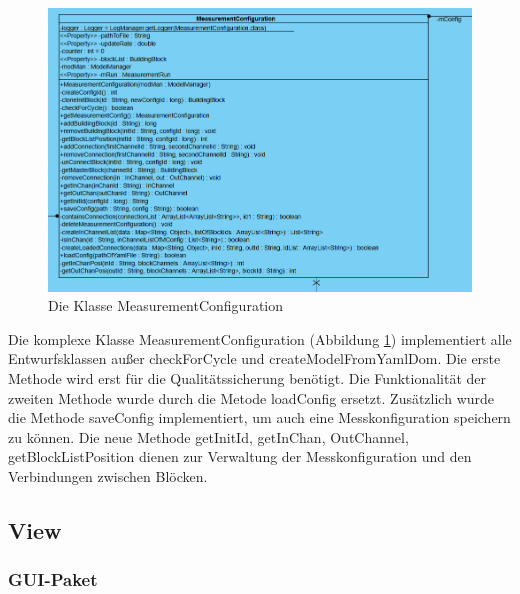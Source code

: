 \documentclass[parskip=full]{scrartcl}
\begin{document}
\begin{figure}[htbp]
	\begin{center}
		\includegraphics[width = 14cm]{Grafiken/messconfig.PNG}
		\caption{Die Klasse MeasurementConfiguration}
		\label{messconfig}
	\end{center}
\end{figure}

Die komplexe Klasse MeasurementConfiguration (Abbildung \ref{messconfig}) implementiert alle Entwurfsklassen außer checkForCycle und createModelFromYamlDom. Die erste Methode wird erst für die Qualitätssicherung benötigt. Die Funktionalität der zweiten Methode wurde durch die Metode loadConfig ersetzt. Zusätzlich wurde die Methode saveConfig implementiert, um auch eine Messkonfiguration speichern zu können. Die neue Methode getInitId, getInChan, OutChannel, getBlockListPosition dienen zur Verwaltung der Messkonfiguration und den Verbindungen zwischen Blöcken.

\subsection{View}


\subsubsection{GUI-Paket}
\end{document}
